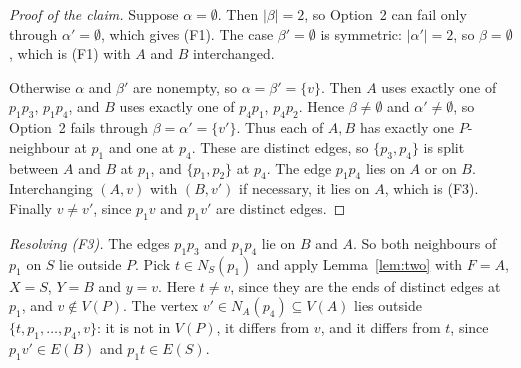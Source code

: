 \documentclass[11pt]{amsart}
\theoremstyle{definition}
\theoremstyle{remark}
\begin{document}
\begin{proof}[Proof of the claim]
Suppose $\alpha=\emptyset$. Then $|\beta|=2$, so Option~2 can fail only through
$\alpha'=\emptyset$, which gives (F1). The case $\beta'=\emptyset$ is symmetric: $|\alpha'|=2$, so
$\beta=\emptyset$, which is (F1) with $A$ and $B$ interchanged.

Otherwise $\alpha$ and $\beta'$ are nonempty, so $\alpha=\beta'=\{v\}$. Then $A$ uses exactly one
of $p_1p_3$, $p_1p_4$, and $B$ uses exactly one of $p_4p_1$, $p_4p_2$. Hence $\beta\ne\emptyset$
and $\alpha'\ne\emptyset$, so Option~2 fails through $\beta=\alpha'=\{v'\}$. Thus each of $A,B$
has exactly one $P$-neighbour at $p_1$ and one at $p_4$. These are distinct edges, so
$\{p_3,p_4\}$ is split between $A$ and $B$ at $p_1$, and $\{p_1,p_2\}$ at $p_4$. The edge
$p_1p_4$ lies on $A$ or on $B$. Interchanging $(A,v)$ with $(B,v')$ if necessary, it lies on $A$,
which is (F3). Finally $v\ne v'$, since $p_1v$ and $p_1v'$ are distinct edges.
\end{proof}

\emph{Resolving (F3).} The edges $p_1p_3$ and $p_1p_4$ lie on $B$ and $A$. So both neighbours of
$p_1$ on $S$ lie outside $P$. Pick $t\in N_S(p_1)$ and apply Lemma~\ref{lem:two} with $F=A$,
$X=S$, $Y=B$ and $y=v$. Here $t\ne v$, since they are the ends of distinct edges at $p_1$, and
$v\notin V(P)$. The vertex $v'\in N_A(p_4)\subseteq V(A)$ lies outside
$\{t,p_1,\dots,p_4,v\}$: it is not in $V(P)$, it differs from $v$, and it differs from $t$, since
$p_1v'\in E(B)$ and $p_1t\in E(S)$.
\end{document}

